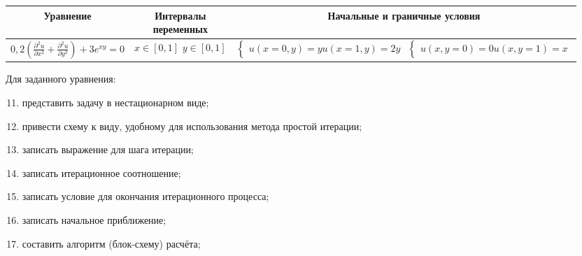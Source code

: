 \documentclass[12pt, a4paper]{report}
\begin{document}
	\begin{center}
		\begin{tabular}{||c|c|c||}
			\hline
			Уравнение & \makecell{Интервалы \\ переменных} & Начальные и граничные условия \\

			\hline
			\small 
			$ 0,2(\frac{\partial^{2} u}{\partial x^{2}} + \frac{\partial^{2} u}{\partial y^{2}}) + 3e^{xy} = 0 $ & \makecell{$ x \in [0, 1] $ \\ $ y \in [0, 1] $} & \makecell{$\begin{cases} u(x = 0, y) = y \\ u(x = 1, y) = 2y \end{cases}$ \\ $\begin{cases} u(x, y = 0) = 0 \\ u(x, y = 1) = x \end{cases}$} \\

			\hline
		\end{tabular}
	\end{center}
	\par
	Для заданного уравнения:
	\begin{enumerate}
		\setcounter{enumi}{10}
		\item представить задачу в нестационарном виде;
		\item привести схему к виду, удобному для использования метода простой итерации;
		\item записать выражение для шага итерации;
		\item записать итерационное соотношение;
		\item записать условие для окончания итерационного процесса;
		\item записать начальное приближение;
		\item составить алгоритм (блок-схему) расчёта;
	\end{enumerate}
\end{document}
